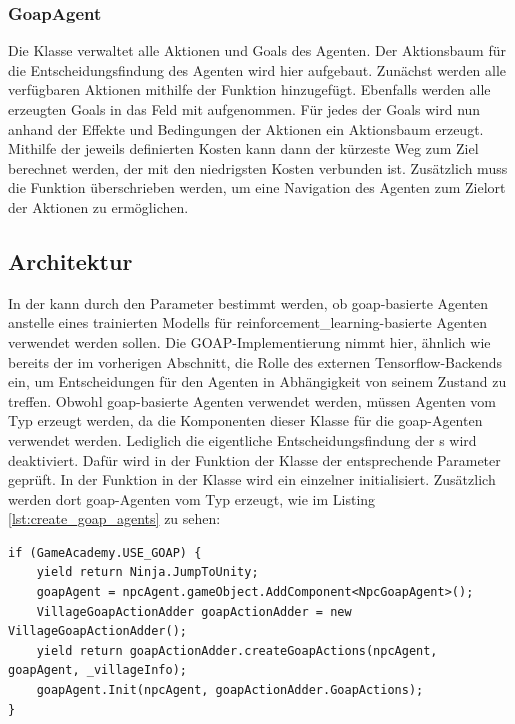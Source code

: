\subsubsection{GoapAgent}
Die Klasse  verwaltet alle Aktionen und Goals des Agenten. Der Aktionsbaum für die Entscheidungsfindung des Agenten wird hier aufgebaut.
Zunächst werden alle verfügbaren Aktionen mithilfe der Funktion  hinzugefügt. Ebenfalls werden alle erzeugten Goals in das Feld  mit aufgenommen.
Für jedes der Goals wird nun anhand der Effekte und Bedingungen der Aktionen ein Aktionsbaum erzeugt. Mithilfe der jeweils definierten Kosten kann dann der kürzeste Weg zum Ziel berechnet werden, der mit den niedrigsten Kosten verbunden ist.
Zusätzlich muss die Funktion  überschrieben werden, um eine Navigation des Agenten zum Zielort der Aktionen zu ermöglichen.


\subsection{Architektur}
In der  kann durch den Parameter  bestimmt werden, ob \ac{goap}-basierte Agenten anstelle eines trainierten Modells für \ac{reinforcement_learning}-basierte Agenten verwendet werden sollen. Die GOAP-Implementierung nimmt hier, ähnlich wie bereits der  im vorherigen Abschnitt, die Rolle des externen Tensorflow-Backends ein, um Entscheidungen für den Agenten in Abhängigkeit von seinem Zustand zu treffen. Obwohl \ac{goap}-basierte Agenten verwendet werden, müssen Agenten vom Typ  erzeugt werden, da die Komponenten dieser Klasse für die \ac{goap}-Agenten verwendet werden. Lediglich die eigentliche Entscheidungsfindung der s wird deaktiviert. Dafür wird in der Funktion  der Klasse  der entsprechende Parameter geprüft.
In der Funktion  in der Klasse  wird ein einzelner  initialisiert. Zusätzlich werden dort \ac{goap}-Agenten vom Typ  erzeugt, wie im Listing \ref{lst:create_goap_agents} zu sehen:

\begin{minipage}{\linewidth}
\begin{lstlisting}[linewidth=16.4cm, label=lst:create_goap_agents, caption=Erzeugung \ac{goap}-basierter Agenten \inlinecode{NpcGoapAgent}, xleftmargin=1cm]
if (GameAcademy.USE_GOAP) {
    yield return Ninja.JumpToUnity;
    goapAgent = npcAgent.gameObject.AddComponent<NpcGoapAgent>();
    VillageGoapActionAdder goapActionAdder = new VillageGoapActionAdder();
    yield return goapActionAdder.createGoapActions(npcAgent, goapAgent, _villageInfo);
    goapAgent.Init(npcAgent, goapActionAdder.GoapActions);
}
\end{lstlisting}
\end{minipage}

